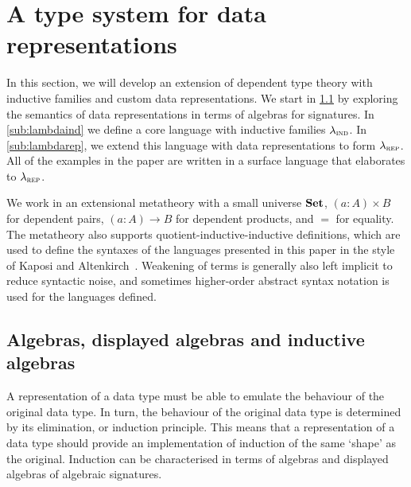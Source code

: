\section{A type system for data representations}\label{sec:type-system}


In this section, we will develop an extension of dependent type theory with
inductive families and custom data representations. We start in
\cref{sub:algebras} by exploring the semantics of data representations in terms
of algebras for signatures. In \cref{sub:lambdaind}
we define a core language with inductive families $\lambda_{\textsc{ind}}$. In
\cref{sub:lambdarep}, we extend this language with data representations to form
$\lambda_{\textsc{rep}}$. All of the examples in the paper are written in a surface language
that elaborates to $\lambda_{\textsc{rep}}$.

We work in an extensional metatheory with a small universe $\mathbf{Set}$, $(a : A)
\times B$ for dependent pairs, $(a : A) \to B$ for dependent products, and $=$
for equality. The metatheory also supports quotient-inductive-inductive
definitions, which are used to define the syntaxes of the languages presented in
this paper in the style of Kaposi and Altenkirch~\cite{Altenkirch2016-zc}.
Weakening of terms is generally also left implicit to reduce syntactic noise,
and sometimes higher-order abstract syntax notation is used for the
languages defined.

\newcommand{\ValidCase}{\mta{ValidCase}}

\subsection{Algebras, displayed algebras and inductive algebras} \label{sub:algebras}

A representation of a data type must be able to emulate the behaviour of the
original data type. In turn, the behaviour of the original data type is
determined by its elimination, or induction principle. This means that a
representation of a data type should provide an implementation of induction of
the same `shape' as the original. Induction can be characterised in terms of
algebras and displayed algebras of algebraic signatures.

